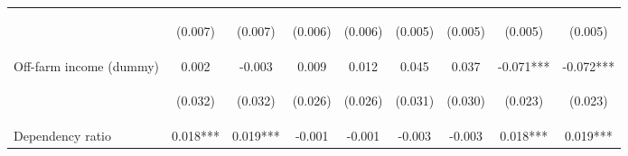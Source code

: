 \begin{center}
\begin{tabular}{lcccccccc}
\vspace{4pt} & \begin{footnotesize}(0.007)\end{footnotesize} & \begin{footnotesize}(0.007)\end{footnotesize} & \begin{footnotesize}(0.006)\end{footnotesize} & \begin{footnotesize}(0.006)\end{footnotesize} & \begin{footnotesize}(0.005)\end{footnotesize} & \begin{footnotesize}(0.005)\end{footnotesize} & \begin{footnotesize}(0.005)\end{footnotesize} & \begin{footnotesize}(0.005)\end{footnotesize} \\
Off-farm income (dummy) & 0.002 & -0.003 & 0.009 & 0.012 & 0.045 & 0.037 & -0.071*** & -0.072*** \\
\vspace{4pt} & \begin{footnotesize}(0.032)\end{footnotesize} & \begin{footnotesize}(0.032)\end{footnotesize} & \begin{footnotesize}(0.026)\end{footnotesize} & \begin{footnotesize}(0.026)\end{footnotesize} & \begin{footnotesize}(0.031)\end{footnotesize} & \begin{footnotesize}(0.030)\end{footnotesize} & \begin{footnotesize}(0.023)\end{footnotesize} & \begin{footnotesize}(0.023)\end{footnotesize} \\
Dependency ratio & 0.018*** & 0.019*** & -0.001 & -0.001 & -0.003 & -0.003 & 0.018*** & 0.019*** \\

\end{tabular}
\end{center}
